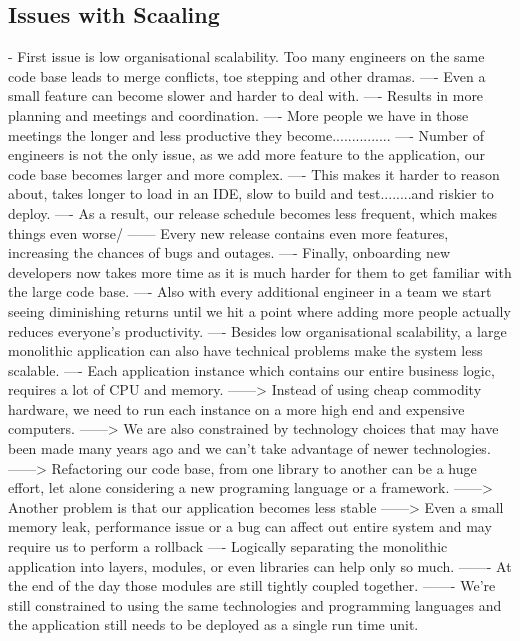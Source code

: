 \documentclass[a4paper, 11pt]{book}
\begin{document}
    \subsection{Issues with Scaaling}
    - First issue is low organisational scalability. Too many engineers on the same code base leads to merge conflicts, toe stepping and other dramas.
    ---- Even a small feature can become slower and harder to deal with.
    ---- Results in more planning and meetings and coordination.
    ---- More people we have in those meetings the longer and less productive they become...............
    ---- Number of engineers is not the only issue, as we add more feature to the application, our code base becomes larger and more complex.
    ---- This makes it harder to reason about, takes longer to load in an IDE, slow to build and test........and riskier to deploy.
    ---- As a result, our release schedule becomes less frequent, which makes things even worse/
    ------ Every new release contains even more features, increasing the chances of bugs and outages.
    ---- Finally, onboarding new developers now takes more time as it is much harder for them to get familiar with the large code base.
    ---- Also with every additional engineer in a team we start seeing diminishing returns until we hit a point where adding more people actually reduces everyone's productivity.
    ---- Besides low organisational scalability, a large monolithic application can also have technical problems make the system less scalable.
    ---- Each application instance which contains our entire business logic, requires a lot of CPU and memory.
    ------> Instead of using cheap commodity hardware, we need to run each instance on a more high end and expensive computers.
    ------> We are also constrained by technology choices that may have been made many years ago and we can't take advantage of newer technologies.
    ------> Refactoring our code base, from one library to another can be a huge effort, let alone considering a new programing language or a framework.
    ------> Another problem is that our application becomes less stable
    ------> Even a small memory leak, performance issue or a bug can affect out entire system and may require us to perform a rollback
    ---- Logically separating the monolithic application into layers, modules, or even libraries can help only so much.
    ------- At the end of the day those modules are still tightly coupled together.
    ------- We're still constrained to using the same technologies and programming languages and the application still needs to be deployed as a single run time unit.
\end{document}
